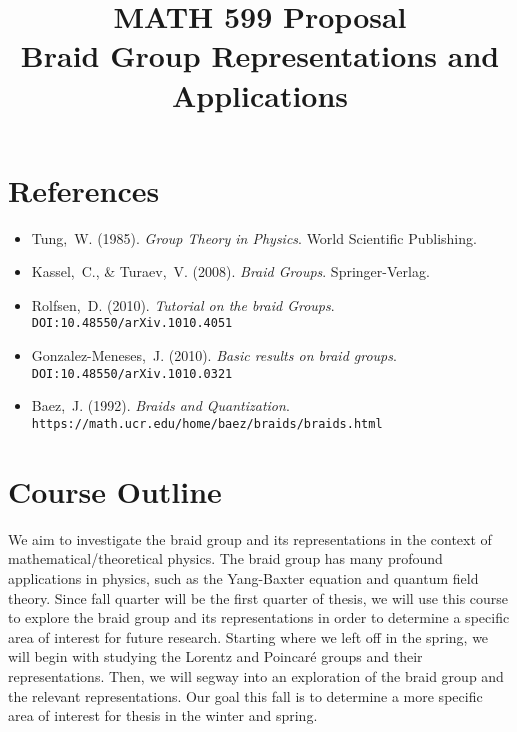 \documentclass[oneside]{memoir}
\title{MATH 599 Proposal\\[0.5em]
	Braid Group Representations and Applications\\	 %
}
\date{\vspace{-5em}}
\begin{document}
\maketitle

%
%

\section{References}
\begin{itemize}
    \item Tung,~W. (1985). \textit{Group Theory in Physics}. World Scientific Publishing.
    \item Kassel,~C., \& Turaev,~V. (2008). \textit{Braid Groups}. Springer-Verlag.
    \item Rolfsen,~D. (2010). \textit{Tutorial on the braid Groups}. \texttt{DOI:\@10.48550/arXiv.1010.4051}
    \item Gonzalez-Meneses,~J. (2010). \textit{Basic results on braid groups}. \texttt{DOI:\@10.48550/arXiv.1010.0321}
    \item Baez,~J. (1992). \textit{Braids and Quantization}. \texttt{https://math.ucr.edu/home/baez/braids/braids.html}
\end{itemize}

\section{Course Outline}

We aim to investigate the braid group and its representations in the context of mathematical/theoretical physics. The braid group has many profound applications in physics, such as the Yang-Baxter equation and quantum field theory. Since fall quarter will be the first quarter of thesis, we will use this course to explore the braid group and its representations in order to determine a specific area of interest for future research.  Starting where we left off in the spring, we will begin with studying the Lorentz and Poincar\'e groups and their representations.  Then, we will segway into an exploration of the braid group and the relevant representations.  Our goal this fall is to determine a more specific area of interest for thesis in the winter and spring.
\end{document}
